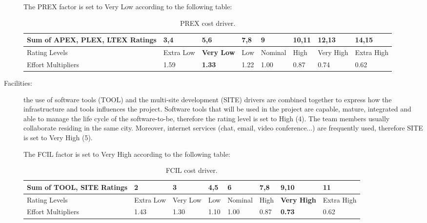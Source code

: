 \begin{description}
The PREX factor is set to Very Low according to the following table:

\begin{table}[H]
	\begin{adjustwidth}{-.5in}{-.5in}
    \centering
    \begin{tabular}{p{4cm}|p{1cm}|p{1cm}|p{1cm}|p{1.5cm}|p{1cm}|p{1cm}|p{1cm}}
        \hline
        Sum of APEX, PLEX, LTEX Ratings & 3,4 & \textbf{5,6} & 7,8 & 9 & 10,11 & 12,13 & 14,15 \\
        \hline
        \hline
        Rating Levels & Extra Low & \textbf{Very Low} & Low & Nominal & High & Very High & Extra High \\
        \hline
        Effort Multipliers & 1.59 & \textbf{1.33} & 1.22 & 1.00 & 0.87 & 0.74 & 0.62 \\
        \hline
    \end{tabular}
    \caption{PREX cost driver.}
    \end{adjustwidth}
\end{table}

\item[Facilities:] the use of software tools (TOOL) and the multi-site development (SITE) drivers are combined together to express how the infrastructure and tools influences the project. Software tools that will be used in the project are capable, mature, integrated and able to manage the life cycle of the software-to-be, therefore the rating level is set to High (4). The team members usually collaborate residing in the same city. Moreover, internet services (chat, email, video conference...) are frequently used, therefore SITE is set to Very High (5).

The FCIL factor is set to Very High according to the following table:

\begin{table}[H]
	\begin{adjustwidth}{-.5in}{-.5in}
    \centering
    \begin{tabular}{p{4cm}|p{1cm}|p{1cm}|p{1cm}|p{1.5cm}|p{1cm}|p{1cm}|p{1cm}}
        \hline
        Sum of TOOL, SITE Ratings & 2 & 3 & 4,5 & 6 & 7,8 & \textbf{9,10} & 11 \\
        \hline
        \hline
        Rating Levels & Extra Low & Very Low & Low & Nominal & High & \textbf{Very High} & Extra High \\
        \hline
        Effort Multipliers & 1.43 & 1.30 & 1.10 & 1.00 & 0.87 & \textbf{0.73} & 0.62 \\
        \hline
    \end{tabular}
    \caption{FCIL cost driver.}
    \end{adjustwidth}
\end{table}


\end{description}
